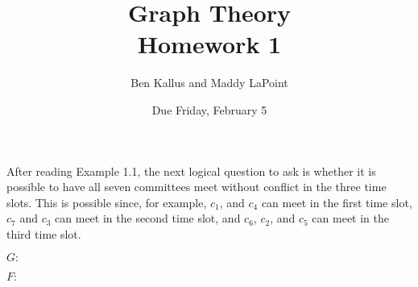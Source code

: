 \documentclass[12pt]{article}
\title{Graph Theory \\ Homework 1}
\author{Ben Kallus and Maddy LaPoint}
\date{Due Friday, February 5}
\begin{document}
\pagecolor{black}
\color{white}
\maketitle


    After reading Example 1.1, the next logical question to ask is whether it is possible to have all seven committees meet without conflict in the three time slots.
    This is possible since, for example, $c_1$, and $c_4$ can meet in the first time slot, $c_7$ and $c_3$ can meet in the second time slot, and $c_6$, $c_2$, and $c_5$ can meet in the third time slot.


\bigskip
{}

    $G:$
    \begin{center}
    \end{center}

\newpage
{}
    
    $F:$

    \newcommand{\cone}{(-.5,-.5)}
    \newcommand{\ctwo}{(1,-4)}
    \newcommand{\cthree}{(-1,-4)}
    \newcommand{\cfour}{(.5,-.5)}
    \newcommand{\cfive}{(-3,-2)}
    \newcommand{\csix}{(-3,0)}
    \newcommand{\cseven}{(.5,-1.5)}
    \newcommand{\ceight}{(-1,2)}
    \newcommand{\cnine}{(1,2)}
    \newcommand{\cten}{(-.5,-1.5)}
    \newcommand{\celeven}{(3,0)}
    \newcommand{\ctwelve}{(3,-2)}
\end{document}
